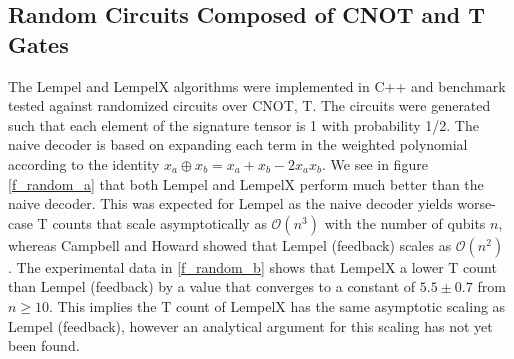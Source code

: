 \documentclass{article}
\theoremstyle{definition}
\theoremstyle{problem}
\theoremstyle{lemma}
\begin{document}
				\subsection{Random Circuits Composed of CNOT and T Gates}
				\label{s_rand}
				The Lempel and LempelX algorithms were implemented in C++ and benchmark tested against randomized circuits over CNOT, T. The circuits were generated such that each element of the signature tensor is 1 with probability 1/2. The naive decoder is based on expanding each term in the weighted polynomial according to the identity $x_a \oplus x_b = x_a + x_b - 2x_a x_b$. We see in figure \ref{f_random_a} that both Lempel and LempelX perform much better than the naive decoder. This was expected for Lempel as the naive decoder yields worse-case T counts that scale asymptotically as $\mathcal{O}(n^3)$ with the number of qubits $n$, whereas Campbell and Howard showed that Lempel (feedback) scales as $\mathcal{O}(n^2)$ \cite{1_Campbell_2017}. The experimental data in \ref{f_random_b} shows that LempelX a lower T count than Lempel (feedback) by a value that converges to a constant of $5.5\pm 0.7$ from $n\geq 10$. This implies the T count of LempelX has the same asymptotic scaling as Lempel (feedback), however an analytical argument for this scaling has not yet been found.
				
\end{document}
